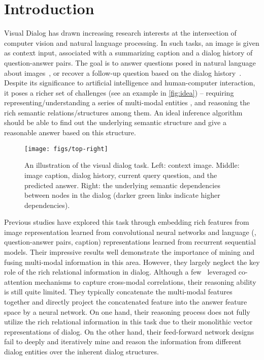 \documentclass[10pt,twocolumn,letterpaper]{article}
\begin{document}
\section{Introduction}
\vspace{-3pt}
Visual Dialog has drawn increasing research interests
at the intersection of computer vision and natural language
processing. In such tasks, an image is given as context input, associated with a summarizing caption and a dialog history of question-answer pairs. The goal is to answer questions posed in natural language about images~\cite{das2017visual}, or recover a follow-up question based on the dialog history~\cite{jain2018two}.
Despite its significance to artificial intelligence and human-computer interaction,  it poses a richer set of challenges (see an example in \autoref{fig:idea}) -- requiring representing/understanding a series of multi-modal entities , and reasoning the rich semantic relations/structures among them. An ideal inference algorithm should be able to find out the underlying semantic structure and give a reasonable answer based on this structure.


\begin{figure}[t]
\centering
      \texttt{[image: figs/top-right]}
\caption{\small An illustration of the visual dialog task. Left: context image. Middle: image caption, dialog history, current query question, and the predicted answer. Right: the underlying semantic dependencies between nodes in the dialog (darker green links indicate higher dependencies). }
\label{fig:idea}
\vspace{-12pt}
\end{figure}



Previous studies have explored this task through embedding rich features from image representation learned from convolutional neural networks and language (\ie, question-answer pairs, caption) representations
learned from recurrent sequential models. Their impressive results well demonstrate the importance of mining and fusing multi-modal information in this area. However, they largely neglect the key role of the rich relational information in dialog. Although a few~\cite{zhuang2018parallel,Wu_2018_CVPR} leveraged co-attention mechanisms to capture cross-modal correlations, their reasoning ability is still quite limited. They typically concatenate the multi-modal features together and directly project the concatenated feature into the answer feature space by a neural network. On one hand, their reasoning process does not fully utilize the rich relational information in this task due to their monolithic vector representations of dialog. On the other hand, their feed-forward network designs fail to deeply and iteratively mine and reason the information from different dialog entities over the inherent dialog structures.
\end{document}
